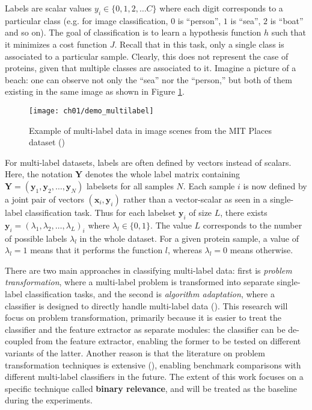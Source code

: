\par Labels are scalar values $y_{i} \in \{0, 1, 2, \dots C\}$ where each digit 
corresponds to a particular class (e.g. for image classification, $0$ is
``person'', $1$ is ``sea'', $2$ is ``boat'' and so on). The goal of
classification is to learn a hypothesis function $h$ such that it minimizes a
cost function $J$. Recall that in this task, only a single class is associated
to a particular sample. Clearly, this does not represent the case of proteins,
given that multiple classes are associated to it. Imagine a picture of a beach:
one can observe not only the ``sea'' nor the ``person,'' but both of them
existing in the same image as shown in Figure \ref{demo:multilabel}.

\begin{figure}[!t]
  \centering
  \texttt{[image: ch01/demo\_multilabel]}
  \caption[Example of multi-label data in image scenes from MIT
  Places dataset]{
      Example of multi-label data in image scenes from the MIT
      Places dataset (\cite{zhou2014learning})}
  \label{demo:multilabel}
\end{figure}

\par For multi-label datasets, labels are often defined by vectors instead of
scalars. Here, the notation $\mathbf{Y}$ denotes the whole label matrix
containing $\mathbf{Y} = (\mathbf{y}_{1},\mathbf{y}_{2}, \dots,
\mathbf{y}_{N})$ labelsets for all samples $N$. Each sample $i$ is now defined
by a joint pair of vectors $(\mathbf{x}_{i}, \mathbf{y}_{i})$ rather than a
vector-scalar as seen in a single-label classification task. Thus for each
labelset $\mathbf{y}_{i}$ of size $L$, there exists $\mathbf{y}_{i} =
(\lambda_{1}, \lambda_{2}, \dots, \lambda_{L})_{i}$ where $\lambda_{l} \in \{0,
1\}$. The value $L$ corresponds to the number of possible labels $\lambda_{l}$
in the whole dataset. For a given protein sample, a value of $\lambda_{l}=1$
means that it performs the function $l$, whereas $\lambda_{l}=0$ means
otherwise.

\par There are two main approaches in classifying multi-label data: first is
\textit{problem transformation}, where a multi-label problem is transformed
into separate single-label classification tasks, and the second is
\textit{algorithm adaptation}, where a classifier is designed to 
directly handle multi-label data (\cite{tsoumakas2007multilabel}). This
research will focus on problem transformation, primarily because it is easier
to treat the classifier and the feature extractor as separate modules: the
classifier can be de-coupled from the feature extractor, enabling the former
to be tested on different variants of the latter.  Another reason is that the
literature on problem transformation techniques is extensive
(\cite{zhang2014review, madjarov2012extensive}), enabling benchmark
comparisons with different multi-label classifiers in the future. The extent
of this work focuses on a specific technique called \textbf{binary relevance},
and will be treated as the baseline during the experiments.

